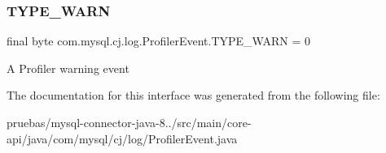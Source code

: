 \subsubsection{\texorpdfstring{T\+Y\+P\+E\+\_\+\+W\+A\+RN}{TYPE\_WARN}}
{\footnotesize\ttfamily final byte com.\+mysql.\+cj.\+log.\+Profiler\+Event.\+T\+Y\+P\+E\+\_\+\+W\+A\+RN = 0\hspace{0.3cm}{\ttfamily [static]}}

A Profiler warning event 

The documentation for this interface was generated from the following file\+:\begin{DoxyCompactItemize}
\item 
pruebas/mysql-\/connector-\/java-\/8../src/main/core-\/api/java/com/mysql/cj/log/Profiler\+Event.\+java\end{DoxyCompactItemize}
